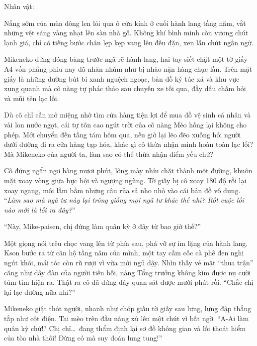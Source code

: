 ﻿\documentclass[../main.tex]{subfiles}
\begin{document}
\begin{center}
    {\caviar\fontsize{12pt}{12pt}\selectfont Nhân vật:   }
\end{center}

Nắng sớm của mùa đông len lỏi qua ô cửa kính ở cuối hành lang tầng năm, vắt những vệt sáng vàng nhạt lên sàn nhà gỗ. Không khí bình minh còn vương chút lạnh giá, chỉ có tiếng bước chân lẹp kẹp vang lên đều đặn, xen lẫn chút ngần ngừ.

Mikeneko đứng đóng băng trước ngã rẽ hành lang, hai tay siết chặt một tờ giấy A4 vốn phẳng phiu nay đã nhăn nhúm như bị nhào nặn hàng chục lần. Trên mặt giấy là những đường bút bi xanh nguệch ngoạc, bản đồ ký túc xá và khu vực xung quanh mà cô nàng tự phác thảo sau chuyến xe tối qua, đầy dấu chấm hỏi và mũi tên lạc lối.

Dù cô chỉ cần mở miệng nhờ tìm cửa hàng tiện lợi để mua đồ vệ sinh cá nhân và vài lon nước ngọt, cái tự tôn cao ngút trời của cô nàng Mèo hồng lại không cho phép. Mới chuyển đến tầng tám hôm qua, nếu giờ lại lẽo đẽo xuống hỏi người dưới đường đi ra cửa hàng tạp hóa, khác gì cô thừa nhận mình hoàn toàn lạc lối? Mà Mikeneko của người ta, làm sao có thể thừa nhận điểm yếu chứ?

Cô đứng ngẩn ngơ hàng mươi phút, lông mày nhíu chặt thành một đường, khuôn mặt xoay vòng giữa bực bội và ngượng ngùng. Tờ giấy bị cô xoay 180 độ rồi lại xoay ngang, môi lầm bầm những câu rủa sả nho nhỏ vào cái bản đồ vô dụng. ``\textit{Làm sao mà ngã tư này lại trông giống mọi ngã tư khác thế nhỉ? Rốt cuộc lối nào mới là lối ra đây?}''

``Này, Mike-paisen, chị đứng làm quân kỳ ở đây từ bao giờ thế?''

Một giọng nói trêu chọc vang lên từ phía sau, phá vỡ sự im lặng của hành lang. Kson bước ra từ căn hộ tầng năm của mình, một tay cầm cốc cà phê đen nghi ngút khói, mái tóc còn rũ rượi vì vừa mới ngủ dậy. Nhìn thấy vẻ mặt ``thua trận'' căng như dây đàn của người tiền bối, nàng Tổng trưởng không kìm được nụ cười tủm tỉm hiện ra. Thật ra cô đã đứng đây quan sát được mười phút rồi. ``Chắc chị lại lạc đường nữa nhỉ?''

Mikeneko giật thót người, nhanh như chớp giấu tờ giấy sau lưng, lưng đập thẳng tắp như cột điện. Tai mèo trên đầu nàng xù lên một chút vì bất ngờ. ``A-Ai làm quân kỳ chứ!? Chị chỉ\dots\ đang thẩm định lại sơ đồ không gian và lối thoát hiểm của tòa nhà thôi! Đừng có mà suy đoán lung tung!''
\end{document}
